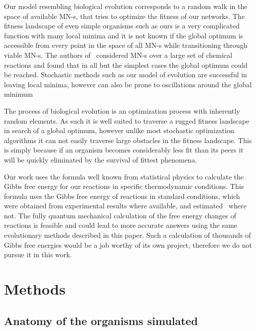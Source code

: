 \documentclass[a4paper,12pt]{article}
\begin{document}
	Our model resembling biological evolution corresponds to a random walk in the space of available MN-s, that tries to optimize the fitness of our networks. The fitness landscape of even simple organisms such as ours is a very complicated function with many local minima and it is not known if the global optimum is accessible from every point in the space of all MN-s while transitioning through viable MN-s. The authors of \cite{historical}~considered MN-s over a large set of chemical reactions and found that in all but the simplest cases the global optimum could be reached. Stochastic methods such as our model of evolution are successful in leaving local minima, however can also be prone to oscillations around the global minimum 

	The process of biological evolution is an optimization process with inherently random elements. As such it is well suited to traverse a rugged fitness landscape in search of a global optimum, however unlike most stochastic optimization algorithms it can not easily traverse large obstacles in the fitness landscape. This is simply because if an organism becomes considerably less fit than its peers it will be quickly eliminated by the survival of fittest phenomena.

	Our work uses the formula well known from statistical physics to calculate the Gibbs free energy for our reactions in specific thermodynamic conditions. This formula uses the Gibbs free energy of reactions in standard conditions, which were obtained from experimental results where available, and estimated \cite{BartekLower}~where not. The fully quantum mechanical calculation of the free energy changes of reactions is feasible and could lead to more accurate answers using the same evolutionary methods described in this paper. Such a calculation of thousands of Gibbs free energies would be a job worthy of its own project, therefore we do not pursue it in this work. 

	
\section{Methods}
\label{sec:methods}



	\subsection{Anatomy of the organisms simulated}
	\label{ssub:anatomy_of_the_oganisms_simulated}
\end{document}
